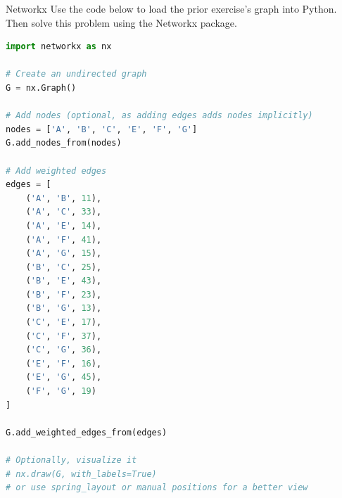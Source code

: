 \begin{ex}{Networkx}{}
Use the code below to load the prior exercise's graph into Python.  Then solve this problem using the Networkx package.

\begin{lstlisting}[language=Python, caption={Loading the graph into NetworkX}]
import networkx as nx

# Create an undirected graph
G = nx.Graph()

# Add nodes (optional, as adding edges adds nodes implicitly)
nodes = ['A', 'B', 'C', 'E', 'F', 'G']
G.add_nodes_from(nodes)

# Add weighted edges
edges = [
    ('A', 'B', 11),
    ('A', 'C', 33),
    ('A', 'E', 14),
    ('A', 'F', 41),
    ('A', 'G', 15),
    ('B', 'C', 25),
    ('B', 'E', 43),
    ('B', 'F', 23),
    ('B', 'G', 13),
    ('C', 'E', 17),
    ('C', 'F', 37),
    ('C', 'G', 36),
    ('E', 'F', 16),
    ('E', 'G', 45),
    ('F', 'G', 19)
]

G.add_weighted_edges_from(edges)

# Optionally, visualize it
# nx.draw(G, with_labels=True)
# or use spring_layout or manual positions for a better view
\end{lstlisting}

\end{ex}

